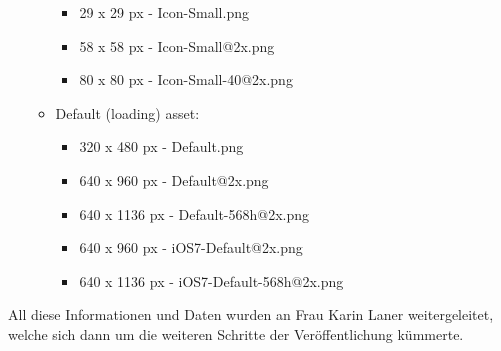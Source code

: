 \begin{itemize}
\begin{itemize}
\begin{itemize}
				\item 29 x 29 px - Icon-Small.png
				\item 58 x 58 px - Icon-Small@2x.png
				\item 80 x 80 px - Icon-Small-40@2x.png
			\end{itemize}
		\item Default (loading) asset:
			\begin{itemize}
				\item 320 x 480 px - Default.png
				\item 640 x 960 px - Default@2x.png
				\item 640 x 1136 px - Default-568h@2x.png
				\item 640 x 960 px - iOS7-Default@2x.png
				\item 640 x 1136 px - iOS7-Default-568h@2x.png
			\end{itemize}
	\end{itemize}
\end{itemize}
All diese Informationen und Daten wurden an Frau Karin Laner weitergeleitet, welche sich dann um die weiteren Schritte der Veröffentlichung kümmerte.\\

%
%
% 
%
